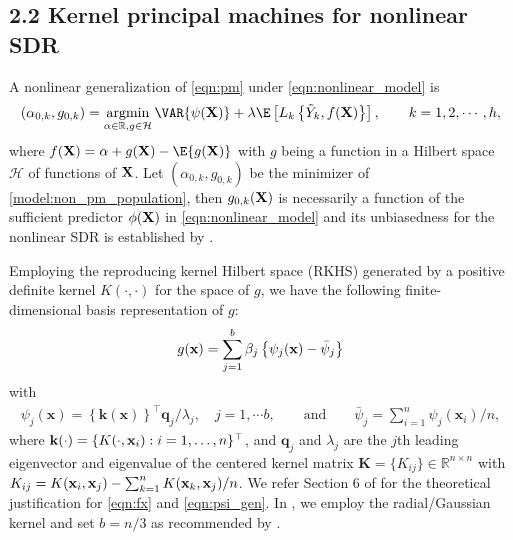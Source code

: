 \subsection{2.2 Kernel principal machines for nonlinear SDR} \label{sec:NLPSDR}

A nonlinear generalization of \eqref{eqn:pm} under \eqref{eqn:nonlinear_model} is
\begin{equation}\label{model:non_pm_population}
(\alpha_{0,k}, g_{0,k}) = \argmin_{\alpha \in \mathbb{R}, g \in \mathcal{H}} \VAR \{\psi(\bX)\}+\lambda \E\left[ {L}_k \left\{ \tilde{Y}_{k}, f(\bX) \right\} \right], \qquad k = 1, 2, \cdots, h,
\end{equation}
where $f(\bX)=\alpha+g(\bX)-\E\{g(\bX)\}$ with $g$ being a function in a Hilbert space $\mathcal{H}$ of functions of $\mathbf{X}$. 
Let $(\alpha_{0,k}, g_{0,k})$ be the minimizer of \eqref{model:non_pm_population}, then $g_{0,k}(\mathbf{X})$ is necessarily a function of the sufficient predictor $\phi(\mathbf{X})$ in \eqref{eqn:nonlinear_model} and its unbiasedness for the nonlinear SDR is established by \citet{Li2011::psvm}.

Employing the reproducing kernel Hilbert space (RKHS) generated by a positive definite kernel $K(\cdot, \cdot)$ for the space of $g$, we have the following finite-dimensional basis representation of $g$:
\begin{align}\label{eqn:fx}
g(\mathbf{x}) = \sum_{j=1}^b \beta_j \left\{\psi_{j}(\mathbf{x})- \bar \psi_j \right\}
\end{align}
with 
\begin{align}\label{eqn:psi_gen}
\psi_j(\mathbf{x})=\left\{\mathbf{k}(\mathbf{x})\right\}^{\top} \mathbf{q}_j / \lambda_j, \quad j=1, \cdots b, \qquad \mbox{and} \qquad \bar \psi_j = \sum_{i=1}^{n}\psi_{j}\left(\mathbf{x}_{i}\right)/n,
\end{align}
where $\mathbf{k}(\cdot)=\{K(\cdot, \mathbf{x}_i) : i=1,\ldots,n\}^{\top}$, and $\mathbf{q}_j$ and $\lambda_j$ are the $j$th leading eigenvector and eigenvalue of the centered kernel matrix $\mathbf{K} = \{K_{ij}\} \in \mathbb{R}^{n\times n}$ with $K_{ij} = K(\mathbf{x}_i, \mathbf{x}_j) - \sum_{k = 1}^n K(\mathbf{x}_k, \mathbf{x}_j)/n$. We refer Section 6 of \citet{Li2011::psvm} for the theoretical justification for \eqref{eqn:fx} and \eqref{eqn:psi_gen}.  In , we employ the radial/Gaussian kernel and set $b = n/3$ as recommended by \citet{Li2011::psvm}. 

